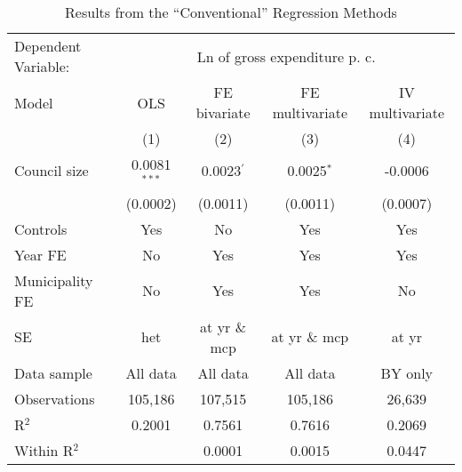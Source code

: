 
\begin{table}
   \caption{\label{tab:conv_results} Results from the ``Conventional'' Regression Methods}
   \centering
   \begin{tabular}{lcccc}
      \toprule \midrule
      Dependent Variable: & \multicolumn{4}{c}{Ln of gross expenditure \acs{p. c.}}\\
      Model         & \acs{OLS}      & \acs{FE} bivariate    & \acs{FE} multivariate  & \acs{IV} multivariate \\    
                    & (1)            & (2)                   & (3)                    & (4)\\  
      \midrule
      Council size  & 0.0081$^{***}$ & 0.0023$^{'}$          & 0.0025$^{*}$           & -0.0006\\   
                    & (0.0002)       & (0.0011)              & (0.0011)               & (0.0007)\\   
      \midrule
      Controls      & Yes            & No                    & Yes                    & Yes\\  
      Year \ac{FE}  & No             & Yes                   & Yes                    & Yes\\  
      Municipality \ac{FE} & No      & Yes                   & Yes                    & No \\  
      \acs{SE} & \acs{het} & at \acs{yr} \& \acs{mcp} & at \acs{yr} \& \acs{mcp} & at \acs{yr}\\
      \midrule
      Data sample   & All data       & All data              & All data               & \acs{BY} only\\   
      Observations  & 105,186        & 107,515               & 105,186                & 26,639\\  
      R$^2$         & 0.2001        & 0.7561               & 0.7616                & 0.2069\\  
      Within R$^2$  &                & 0.0001  & 0.0015                & 0.0447\\  
      \midrule \bottomrule
   \end{tabular}
   
   \vspace{0.25cm}
   \par {}
\end{table}


